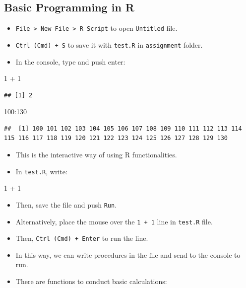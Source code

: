 \documentclass[
]{book}
\newenvironment{Shaded}{\begin{snugshade}}{\end{snugshade}}
\newcommand{\DecValTok}[1]{\textcolor[rgb]{0.00,0.00,0.81}{#1}}
\newcommand{\SpecialCharTok}[1]{\textcolor[rgb]{0.00,0.00,0.00}{#1}}
\providecommand{\tightlist}{%
  \setlength{\itemsep}{0pt}\setlength{\parskip}{0pt}}
\begin{document}
\hypertarget{basic-programming-in-r}{%
\subsection{Basic Programming in R}\label{basic-programming-in-r}}

\begin{itemize}
\tightlist
\item
  \texttt{File\ \textgreater{}\ New\ File\ \textgreater{}\ R\ Script} to open \texttt{Untitled} file.
\item
  \texttt{Ctrl\ (Cmd)\ +\ S} to save it with \texttt{test.R} in \texttt{assignment} folder.
\item
  In the console, type and push enter:
\end{itemize}

\begin{Shaded}
\begin{Highlighting}[]
\DecValTok{1} \SpecialCharTok{+} \DecValTok{1}
\end{Highlighting}
\end{Shaded}

\begin{verbatim}
## [1] 2
\end{verbatim}

\begin{Shaded}
\begin{Highlighting}[]
\DecValTok{100}\SpecialCharTok{:}\DecValTok{130}
\end{Highlighting}
\end{Shaded}

\begin{verbatim}
##  [1] 100 101 102 103 104 105 106 107 108 109 110 111 112 113 114 115 116 117 118 119 120 121 122 123 124 125 126 127 128 129 130
\end{verbatim}

\begin{itemize}
\tightlist
\item
  This is the interactive way of using R functionalities.
\item
  In \texttt{test.R}, write:
\end{itemize}

\begin{Shaded}
\begin{Highlighting}[]
\DecValTok{1} \SpecialCharTok{+} \DecValTok{1}
\end{Highlighting}
\end{Shaded}

\begin{itemize}
\item
  Then, save the file and push \texttt{Run}.
\item
  Alternatively, place the mouse over the \texttt{1\ +\ 1} line in \texttt{test.R} file.
\item
  Then, \texttt{Ctrl\ (Cmd)\ +\ Enter} to run the line.
\item
  In this way, we can write procedures in the file and send to the console to run.
\item
  There are functions to conduct basic calculations:
\end{itemize}
\end{document}

